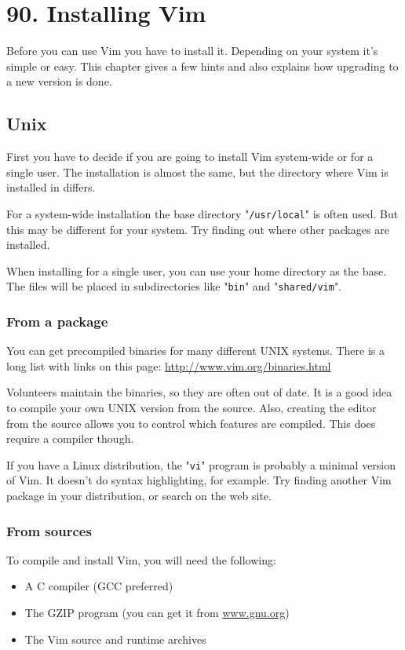 \section{90. Installing Vim}
\label{Installing Vim}
\label{install}
Before you can use Vim you have to install it.
Depending on your system it's simple or easy.
This chapter gives a few hints and also explains how upgrading to a new version is done.
\subsection{Unix}
First you have to decide if you are going to install Vim system-wide or for a single user.
The installation is almost the same, but the directory where Vim is installed in differs.

For a system-wide installation the base directory "\verb!/usr/local!" is often used.
But this may be different for your system.
Try finding out where other packages are installed.

When installing for a single user, you can use your home directory as the base.
The files will be placed in subdirectories like "\verb!bin!" and "\verb!shared/vim!".

\subsubsection{From a package}
You can get precompiled binaries for many different UNIX systems.
There is a long list with links on this page: \url{http://www.vim.org/binaries.html}

Volunteers maintain the binaries, so they are often out of date.
It is a good idea to compile your own UNIX version from the source.
Also, creating the editor from the source allows you to control which features are compiled.
This does require a compiler though.

If you have a Linux distribution, the "\verb!vi!" program is probably a minimal version of Vim.
It doesn't do syntax highlighting, for example.
Try finding another Vim package in your distribution, or search on the web site.

\subsubsection{From sources}
To compile and install Vim, you will need the following:

\begin{itemize}
    \item A C compiler (GCC preferred)
    \item The GZIP program (you can get it from \url{www.gnu.org})
    \item The Vim source and runtime archives
\end{itemize}

